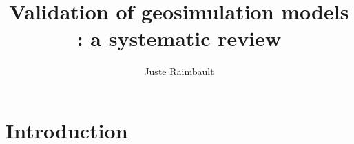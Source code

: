 \documentclass[a4paper,UKenglish,cleveref, autoref, thm-restate]{lipics-v2019}
\title{Validation of geosimulation models : a systematic review}
\author{Juste Raimbault}{LASTIG, Univ. Gustave Eiffel, IGN-ENSG, France \and CASA, UCL, UK \and UPS CNRS 3611 ISC-PIF, France \and UMS CNRS 8504 G{\'e}ographie-cit{\'e}s}{juste.raimbault@ign.fr}{https://orcid.org/0000-0003-0768-9480}{}%
\begin{document}
\maketitle

\begin{abstract}

\end{abstract}

\section{Introduction}






\end{document}
